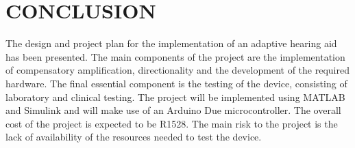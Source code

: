\documentclass[10pt,twocolumn]{witseiepaper}
\begin{document}
\section{CONCLUSION}
The design and project plan for the implementation of an adaptive hearing aid has been presented. The main components of the project are the implementation of compensatory amplification, directionality and the development of the required hardware. The final essential component is the testing of the device, consisting of laboratory and clinical testing. The project will be implemented using MATLAB and Simulink and will make use of an Arduino Due microcontroller. The overall cost of the project is expected to be R1528. The main risk to the project is the lack of availability of the resources needed to test the device.
\balance


\end{document}

